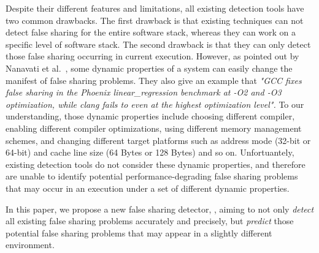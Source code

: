 Despite their different features and limitations, all existing detection tools 
have two common drawbacks.
The first drawback is that existing techniques can not detect false sharing for 
the entire software stack, whereas they can work on a specific level of software stack.
The second drawback is that they can only detect those false sharing occurring in current execution.
However, as pointed out by Nanavati et al.~\cite{OSdetection}, 
some dynamic properties of a system can easily 
change the manifest of false sharing problems. They also give an example that 
{\it "GCC fixes false sharing in the Phoenix linear\_regression benchmark 
at -O2 and -O3 optimization, while clang fails to even at the highest
optimization level".}
To our understanding, those dynamic properties include 
choosing different compiler, 
enabling different compiler optimizations, 
using different memory management schemes,
and changing different target platforms such as address mode (32-bit or 64-bit) and cache line
size (64 Bytes or 128 Bytes) and so on. Unfortuantely, 
existing detection tools do not consider these dynamic properties, and
therefore are unable to identify potential performance-degrading false
sharing problems that may occur in an execution under a set of different 
dynamic properties.

In this paper, we propose a new false sharing detector, , aiming to
not only {\it detect} all existing false sharing problems accurately and precisely,
but {\it predict} those potential 
false sharing problems that may appear in a slightly different environment. 

